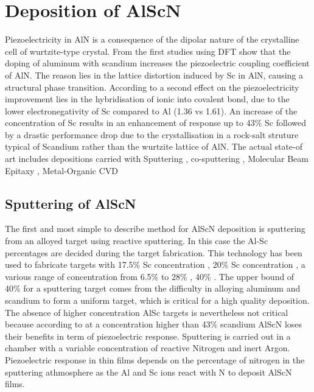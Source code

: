 \section{Deposition of AlScN}
Piezoelectricity in AlN is a consequence of the dipolar nature of the crystalline cell of wurtzite-type crystal. From the first studies using DFT \cite{caro_piezoelectric_2015} \cite{akiyama_enhancement_2009} show that the doping of aluminum with scandium increases the piezoelectric coupling coefficient of AlN. The reason lies in the lattice distortion induced by Sc in AlN, causing a structural phase transition. According to \cite{akiyama_enhancement_2009} a second effect on the piezoelectricity improvement lies in the hybridisation of ionic into covalent bond, due to the lower electronegativity of Sc compared to Al (1.36 vs 1.61). An increase of the concentration of Sc results in an enhancement of response up to 43\% Sc followed by a drastic performance drop due to the crystallisation in a rock-salt struture typical of Scandium rather than the wurtzite lattice of AlN. The actual state-of art includes depositions carried with Sputtering \cite{heinz_sputter_2017} \cite{colombo_investigation_2017} \cite{felmetsger_sputter_2019}, co-sputtering \cite{akiyama_enhancement_2009}, Molecular Beam Epitaxy \cite{park_epitaxial_nodate} \cite{casamento_physical_nodate} \cite{hardy_epitaxial_nodate}, Metal-Organic CVD \cite{leone_metal-organic_2020} 

\subsection{Sputtering of AlScN}
The first and most simple to describe method for AlScN deposition is sputtering from an alloyed target using reactive sputtering. In this case the Al-Sc percentages are decided during the target fabrication. This technology has been used to fabricate targets with 17.5\% Sc concentration \cite{lozzi_al083sc017n_2019}, 20\% Sc concentration \cite{colombo_investigation_2017}, a various range of concentration from 6.5\% to 28\% \cite{heinz_sputter_2017}, 40\% \cite{sandu_impact_2020}. The upper bound of 40\% for a sputtering target comes from the difficulty in alloying aluminum and scandium to form a uniform target, which is critical for a high quality deposition. The absence of higher concentration AlSc targets is nevertheless not critical because according to \cite{akiyama_influence_2009} at a concentration higher than 43\% scandium AlScN loses their benefits in term of piezoelectric response. Sputtering is carried out in a chamber with a variable concentration of reactive Nitrogen and inert Argon. Piezoelectric response in thin films depends on the percentage of nitrogen in the sputtering athmosphere \cite{akiyama_preparation_2010} as the Al and Sc ions react with N to deposit AlScN films.

